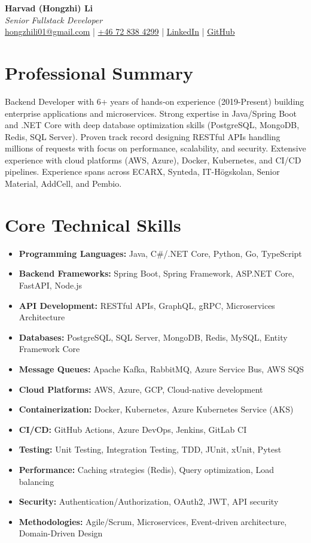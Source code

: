 \documentclass[11pt,a4paper]{article}
\begin{document}
\begin{center}
{\LARGE \textbf{Harvad (Hongzhi) Li}}\\[10pt]
{\Large \textit{Senior Fullstack Developer}}\\[10pt]
\textcolor{titlecolor}{\href{mailto:hongzhili01@gmail.com}{hongzhili01@gmail.com} | \href{tel:+46728384299}{+46 72 838 4299} | \href{https://www.linkedin.com/in/harvad/}{LinkedIn} | \href{https://github.com/bluehawana}{GitHub}}
\end{center}

\vspace{8pt}

\section*{Professional Summary}
Backend Developer with 6+ years of hands-on experience (2019-Present) building enterprise applications and microservices. Strong expertise in Java/Spring Boot and .NET Core with deep database optimization skills (PostgreSQL, MongoDB, Redis, SQL Server). Proven track record designing RESTful APIs handling millions of requests with focus on performance, scalability, and security. Extensive experience with cloud platforms (AWS, Azure), Docker, Kubernetes, and CI/CD pipelines. Experience spans across ECARX, Synteda, IT-Högskolan, Senior Material, AddCell, and Pembio.

\section*{Core Technical Skills}
\begin{itemize}[noitemsep]
\item \textbf{Programming Languages:} Java, C\#/.NET Core, Python, Go, TypeScript
\item \textbf{Backend Frameworks:} Spring Boot, Spring Framework, ASP.NET Core, FastAPI, Node.js
\item \textbf{API Development:} RESTful APIs, GraphQL, gRPC, Microservices Architecture
\item \textbf{Databases:} PostgreSQL, SQL Server, MongoDB, Redis, MySQL, Entity Framework Core
\item \textbf{Message Queues:} Apache Kafka, RabbitMQ, Azure Service Bus, AWS SQS
\item \textbf{Cloud Platforms:} AWS, Azure, GCP, Cloud-native development
\item \textbf{Containerization:} Docker, Kubernetes, Azure Kubernetes Service (AKS)
\item \textbf{CI/CD:} GitHub Actions, Azure DevOps, Jenkins, GitLab CI
\item \textbf{Testing:} Unit Testing, Integration Testing, TDD, JUnit, xUnit, Pytest
\item \textbf{Performance:} Caching strategies (Redis), Query optimization, Load balancing
\item \textbf{Security:} Authentication/Authorization, OAuth2, JWT, API security
\item \textbf{Methodologies:} Agile/Scrum, Microservices, Event-driven architecture, Domain-Driven Design
\end{itemize}
\end{document}
